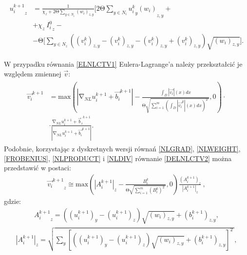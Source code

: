 \documentclass[12pt, twoside, openany]{report}
\theoremstyle{definition}
\begin{document}
\begin{large}
\begin{align}
\begin{aligned}
{u^{k+1}_i}_{z} &= \frac{1}{\chi_z+2\mathrm{\Theta} \sum\limits_{y\in N_i} \left({w_i}\right)_{z,y}} \Biggl[2\mathrm{\Theta }\sum_{y\in N_i} {{{u^k_i}_y \left({w_i}\right)}_{z,y}}+\\
&+ \chi_z \ {I^0_i}_z -\\
&-\mathrm{\Theta} \Biggl[\sum_{y\in N_z} \left({ \left( v^k_i \right)}_{z,y} - { \left( v^k_i \right)}_{z,y} - { \left( v^k_i \right)}_{z,y} + { \left( v^k_i \right)}_{z,y}\right) \sqrt{{\left(w_i\right)}_{z,y}} \Biggr].
\end{aligned}
\label{uNLCTV}
\end{align}
\end{large}
W przypadku równania \eqref{ELNLCTV1} Eulera-Lagrange’a należy przekształcić je względem zmiennej $\overrightarrow{v}$:
\begin{align}
\begin{aligned}
{\overrightarrow{v_i}}^{k+1} &= \mathrm{max} \left(\left|{\mathrm{\nabla }}_{NL}u^{k+1}_i+{\overrightarrow{b_i}}^{k+1}\right|-\frac{\int_D{\left|\overrightarrow{v_i}\right|(x)}dx}{\mathrm{\Theta }\sqrt{\sum^m_{i=1}{{\left(\int_D{\left|{\overrightarrow{v_i}}^k\right|(x)}dx\right)}^2}\ }},0\right) \cdot\\ 
&\cdot \frac{{\mathrm{\nabla }}_{NL}u^{k+1}_i+{{\overrightarrow{b}}_i}^{k+1}}{\left|{\mathrm{\nabla }}_{NL}u^{k+1}_i+{\overrightarrow{b_i}}^{k+1}\right|}.
\label{DELNLCTV2}
\end{aligned}
\end{align}
Podobnie, korzystając z dyskretnych wersji równań \eqref{NLGRAD}, \eqref{NLWEIGHT}, \eqref{FROBENIUS}, \eqref{NLPRODUCT} i \eqref{NLDIV} równanie \eqref{DELNLCTV2} można przedstawić w postaci:
\begin{align}
{{\overrightarrow{v_i}}^{k+1}}_z \cong {\mathrm{max} \left({\left|A^{k+1}_i\right|}_z-\frac{B^k_i}{\mathrm{\Theta }\sqrt{\sum^m_{i=1}{{\left(B^k_i\right)}^2}\ }},0\right)\frac{\left(A^{k+1}_i\right)_z}{{\left|A^{k+1}_i\right|}_z}\ },
\label{VNLCTVITER}
\end{align}
gdzie:
\begin{align}
{A^{k+1}_i}_z=\left({\left(u^{k+1}_i\right)}_y-{\left(u^{k+1}_i\right)}_z\right)\sqrt{{\left(w_{i}\right)}_{z,y}}+{\left(b^{k+1}_i\right)}_{z,y},
\end{align} 
\begin{align}
{\left|A^{k+1}_i\right|}_z=\sqrt{\sum_y{{\left[\left(\left(u^{k+1}_i\right)_y-\left(u^{k+1}_i\right)_z\right)\sqrt{\left(w_i\right)_{z,y}}+\left(b^{k+1}_i\right)_{z,y}\right]}^2}\ },
\end{align}
\end{document}
